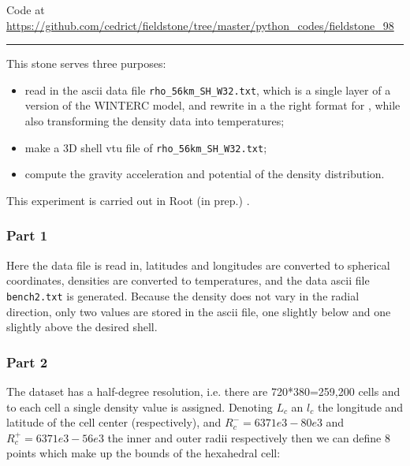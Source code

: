 

\begin{center}
Code at \url{https://github.com/cedrict/fieldstone/tree/master/python_codes/fieldstone_98}
\end{center}

\par\noindent\rule{\textwidth}{0.4pt}


This stone serves three purposes:
\begin{itemize}
\item read in the ascii data file {\tt rho\_56km\_SH\_W32.txt}, which is a 
single layer of a version of the WINTERC model, and rewrite in a the right format 
for \aspect{}, while also transforming the density data into temperatures;
\item make a 3D shell vtu file of {\tt rho\_56km\_SH\_W32.txt};
\item compute the gravity acceleration and potential of the density distribution. 
\end{itemize}
This experiment is carried out in Root \etal (in prep.) \cite{ross21}.

\subsubsection*{Part 1}

Here the data file is read in, latitudes and longitudes are 
converted to spherical coordinates, densities
are converted to temperatures, and the \aspect{} data ascii
file {\tt bench2.txt} is generated.
Because the density does not vary in the radial direction, only two values are stored in the ascii file, 
one slightly below and one slightly above the desired shell.

\subsubsection*{Part 2}

The dataset has a half-degree resolution, i.e.
there are 720*380=259,200 cells and to each cell a single density
value is assigned. Denoting $L_c$ an $l_c$ the longitude and latitude
of the cell center (respectively), and $R^-_c=6371e3-80e3$ and 
$R^+_c=6371e3-56e3$ the inner and outer radii respectively then we can 
define 8 points which make up the bounds of the hexahedral cell:

